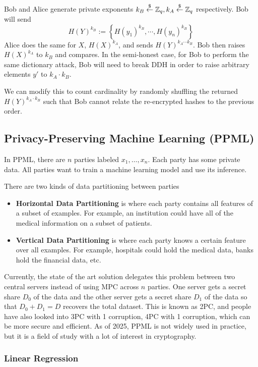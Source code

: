 Bob and Alice generate private exponents $k_B\overset{\$}{\leftarrow} \mathbb Z_q, k_A\overset{\$}{\leftarrow} \mathbb Z_q$ respectively. Bob will send
\[H(Y)^{k_B} := \left\{ H(y_1)^{k_B}, \cdots, H(y_n)^{k_B} \right\}\]
Alice does the same for $X$, $H(X)^{k_A}$, and sends $H(Y)^{k_A\cdots k_B}$. Bob then raises $H(X)^{k_A}$ to $k_B$ and compares. In the semi-honest case, for Bob to perform the same dictionary attack, Bob will need to break DDH in order to raise arbitrary elements $y'$ to $k_A\cdot k_B$.

We can modify this to count cardinality by randomly shuffling the returned $H(Y)^{k_A\cdot k_B}$ such that Bob cannot relate the re-encrypted hashes to the previous order.


\subsection{Privacy-Preserving Machine Learning (PPML)}

In PPML, there are $n$ parties labeled $x_1, \dots, x_n$. Each party has some private data. All parties want to train a machine learning model and use its inference.

There are two kinds of data partitioning between parties
\begin{itemize}
    \item \textbf{Horizontal Data Partitioning} is where each party contains all features of a subset of examples. For example, an institution could have all of the medical information on a subset of patients.
    \item \textbf{Vertical Data Partitioning} is where each party knows a certain feature over all examples. For example, hospitals could hold the medical data, banks hold the financial data, etc.
\end{itemize}

Currently, the state of the art solution delegates this problem between two central servers instead of using MPC across $n$ parties. One server gets a secret share $D_0$ of the data and the other server gets a secret share $D_1$ of the data so that $D_0 + D_1 = D$ recovers the total dataset. This is known as 2PC, and people have also looked into 3PC with 1 corruption, 4PC with 1 corruption, which can be more secure and efficient. As of 2025, PPML is not widely used in practice, but it is a field of study with a lot of interest in cryptography.

\subsubsection{Linear Regression}

